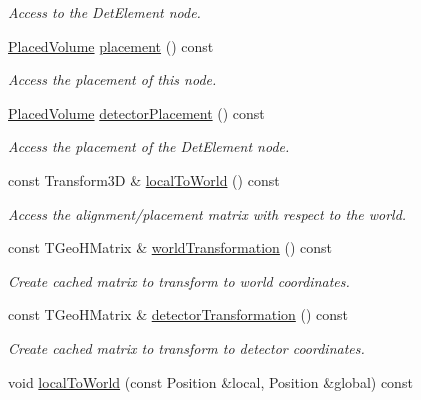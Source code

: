 \begin{DoxyCompactItemize}
\begin{DoxyCompactList}\small\item\em Access to the Det\+Element node. \end{DoxyCompactList}\item 
\hyperlink{class_d_d4hep_1_1_alignments_1_1_alignment_decorator_a3dc9016a6686627ec2e6584aed9c8eeb}{Placed\+Volume} \hyperlink{class_d_d4hep_1_1_alignments_1_1_alignment_decorator_a53596530d2a2f65f640f4016fe41e930}{placement} () const
\begin{DoxyCompactList}\small\item\em Access the placement of this node. \end{DoxyCompactList}\item 
\hyperlink{class_d_d4hep_1_1_alignments_1_1_alignment_decorator_a3dc9016a6686627ec2e6584aed9c8eeb}{Placed\+Volume} \hyperlink{class_d_d4hep_1_1_alignments_1_1_alignment_decorator_a40ab3213777840bd21882ff07add2340}{detector\+Placement} () const
\begin{DoxyCompactList}\small\item\em Access the placement of the Det\+Element node. \end{DoxyCompactList}\item 
const Transform3D \& \hyperlink{class_d_d4hep_1_1_alignments_1_1_alignment_decorator_a106ea95534d193b75e12184ad152624d}{local\+To\+World} () const
\begin{DoxyCompactList}\small\item\em Access the alignment/placement matrix with respect to the world. \end{DoxyCompactList}\item 
const T\+Geo\+H\+Matrix \& \hyperlink{class_d_d4hep_1_1_alignments_1_1_alignment_decorator_a01b40f6c0327de44b984470beb197618}{world\+Transformation} () const
\begin{DoxyCompactList}\small\item\em Create cached matrix to transform to world coordinates. \end{DoxyCompactList}\item 
const T\+Geo\+H\+Matrix \& \hyperlink{class_d_d4hep_1_1_alignments_1_1_alignment_decorator_aefec287bee71b69ebf1a8e100ee3950c}{detector\+Transformation} () const
\begin{DoxyCompactList}\small\item\em Create cached matrix to transform to detector coordinates. \end{DoxyCompactList}\item 
void \hyperlink{class_d_d4hep_1_1_alignments_1_1_alignment_decorator_a5d70fc5ba5a8dad692317207458a57fd}{local\+To\+World} (const Position \&local, Position \&global) const

\end{DoxyCompactItemize}
